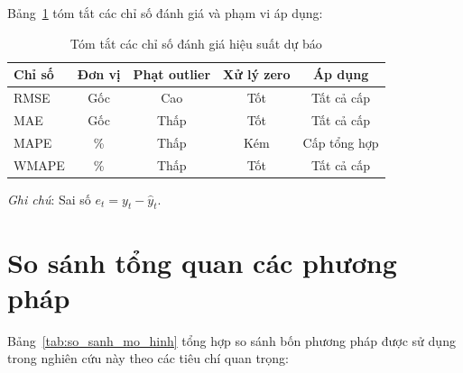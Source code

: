 Bảng~\ref{tab:chi_so_tom_tat} tóm tắt các chỉ số đánh giá và phạm vi áp dụng:

\begin{table}[htbp]
\centering
\caption{Tóm tắt các chỉ số đánh giá hiệu suất dự báo}
\label{tab:chi_so_tom_tat}
\begin{tabular}{lcccc}
\hline
\textbf{Chỉ số} & \textbf{Đơn vị} & \textbf{Phạt outlier} & \textbf{Xử lý zero} & \textbf{Áp dụng} \\
\hline
RMSE  & Gốc & Cao  & Tốt & Tất cả cấp \\
MAE   & Gốc & Thấp & Tốt & Tất cả cấp \\
MAPE  & \%  & Thấp & Kém & Cấp tổng hợp \\
WMAPE & \%  & Thấp & Tốt & Tất cả cấp \\
\hline
\end{tabular}
\begin{flushleft}
\footnotesize \textit{Ghi chú}: Sai số $e_t = y_t - \hat{y}_t$.
\end{flushleft}
\end{table}

\section{So sánh tổng quan các phương pháp}
\label{sec:so_sanh}

Bảng~\ref{tab:so_sanh_mo_hinh} tổng hợp so sánh bốn phương pháp được sử dụng trong nghiên cứu này theo các tiêu chí quan trọng:

